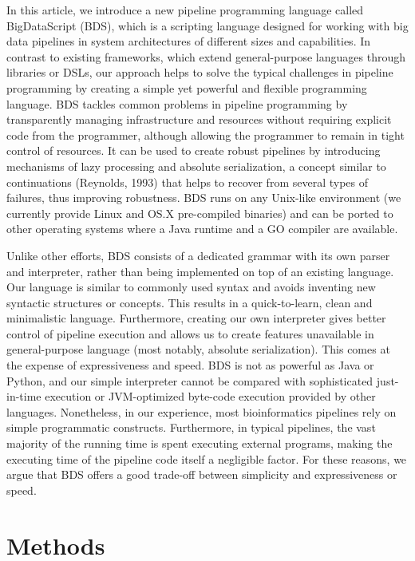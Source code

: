 In this article, we introduce a new pipeline programming language called BigDataScript (BDS), which is a scripting language designed for working with big data pipelines in system architectures of different sizes and capabilities. In contrast to existing frameworks, which extend general-purpose languages through libraries or DSLs, our approach helps to solve the typical challenges in pipeline programming by creating a simple yet powerful and flexible programming language. BDS tackles common problems in pipeline programming by transparently managing infrastructure and resources without requiring explicit code from the programmer, although allowing the programmer to remain in tight control of resources. It can be used to create robust pipelines by introducing mechanisms of lazy processing and absolute serialization, a concept similar to continuations (Reynolds, 1993) that helps to recover from several types of failures, thus improving robustness. BDS runs on any Unix-like environment (we currently provide Linux and OS.X pre-compiled binaries) and can be ported to other operating systems where a Java runtime and a GO compiler are available.

Unlike other efforts, BDS consists of a dedicated grammar with its own parser and interpreter, rather than being implemented on top of an existing language. Our language is similar to commonly used syntax and avoids inventing new syntactic structures or concepts. This results in a quick-to-learn, clean and minimalistic language. Furthermore, creating our own interpreter gives better control of pipeline execution and allows us to create features unavailable in general-purpose language (most notably, absolute serialization). This comes at the expense of expressiveness and speed. BDS is not as powerful as Java or Python, and our simple interpreter cannot be compared with sophisticated just-in-time execution or JVM-optimized byte-code execution provided by other languages. Nonetheless, in our experience, most bioinformatics pipelines rely on simple programmatic constructs. Furthermore, in typical pipelines, the vast majority of the running time is spent executing external programs, making the executing time of the pipeline code itself a negligible factor. For these reasons, we argue that BDS offers a good trade-off between simplicity and expressiveness or speed.

\section{Methods}

